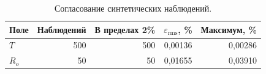 \begin{table}[htbp]
\centering\small
\caption{Согласование синтетических наблюдений.}\label{tab:synthetic}
\begin{tabular}{lrrrr}
\toprule
Поле & Наблюдений & В пределах 2\% & $\varepsilon_{\mathrm{rms}}$, \% & Максимум, \% \\
\midrule
$T$ & 500 & 500 & 0,00136 & 0,00286 \\
$R_o$ & 50 & 50 & 0,01655 & 0,03910 \\
\bottomrule
\end{tabular}
\end{table}
